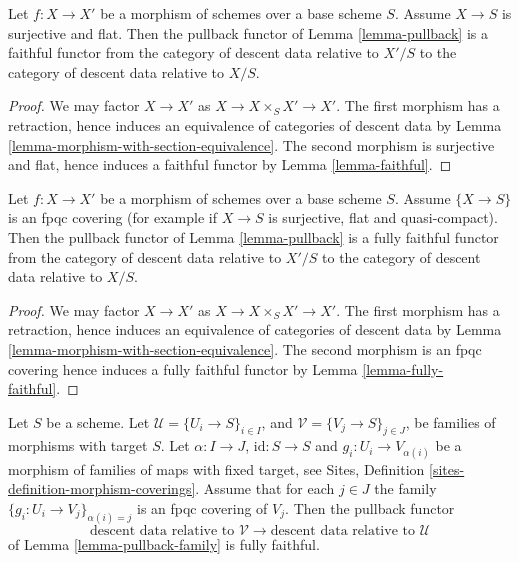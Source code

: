\begin{lemma}
\label{lemma-morphism-source-faithfully-flat}
Let $f : X \to X'$ be a morphism of schemes over a base scheme $S$.
Assume $X \to S$ is surjective and flat. Then the pullback functor
of Lemma \ref{lemma-pullback} is a faithful functor
from the category of descent data relative to $X'/S$ to the
category of descent data relative to $X/S$.
\end{lemma}

\begin{proof}
We may factor $X \to X'$ as $X \to X \times_S X' \to X'$.
The first morphism has a retraction, hence induces an equivalence of
categories of descent data by
Lemma \ref{lemma-morphism-with-section-equivalence}.
The second morphism is surjective and flat, hence induces a
faithful functor by Lemma \ref{lemma-faithful}.
\end{proof}

\begin{lemma}
\label{lemma-morphism-source-fpqc-covering}
Let $f : X \to X'$ be a morphism of schemes over a base scheme $S$.
Assume $\{X \to S\}$ is an fpqc covering (for example if $X \to S$ is
surjective, flat and quasi-compact).
Then the pullback functor of Lemma \ref{lemma-pullback} is a
fully faithful functor from the category of descent data relative
to $X'/S$ to the category of descent data relative to $X/S$.
\end{lemma}

\begin{proof}
We may factor $X \to X'$ as $X \to X \times_S X' \to X'$.
The first morphism has a retraction, hence induces an equivalence of
categories of descent data by
Lemma \ref{lemma-morphism-with-section-equivalence}.
The second morphism is an fpqc covering
hence induces a fully faithful functor by Lemma \ref{lemma-fully-faithful}.
\end{proof}

\begin{lemma}
\label{lemma-fpqc-refinement-coverings-fully-faithful}
Let $S$ be a scheme.
Let $\mathcal{U} = \{U_i \to S\}_{i \in I}$, and
$\mathcal{V} = \{V_j \to S\}_{j \in J}$,
be families of morphisms with target $S$.
Let $\alpha : I \to J$, $\text{id} : S \to S$ and
$g_i : U_i \to V_{\alpha(i)}$ be a morphism of families
of maps with fixed target, see
Sites, Definition \ref{sites-definition-morphism-coverings}.
Assume that for each $j \in J$ the family
$\{g_i : U_i \to V_j\}_{\alpha(i) = j}$ is an fpqc
covering of $V_j$. Then the pullback functor
$$
\text{descent data relative to }
\mathcal{V}
\longrightarrow
\text{descent data relative to }
\mathcal{U}
$$
of Lemma \ref{lemma-pullback-family} is fully faithful.
\end{lemma}

